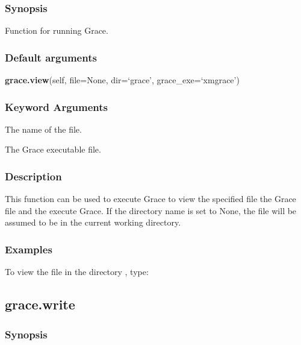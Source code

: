 \subsubsection{Synopsis}

Function for running Grace.

\subsubsection{Default arguments}

\textsf{\textbf{grace.view}(self, file=None, dir=`grace', grace\_exe=`xmgrace')}


\subsubsection{Keyword Arguments}

  The name of the file.

  The Grace executable file.

\subsubsection{Description}

This function can be used to execute Grace to view the specified file the Grace 
 file
and the execute Grace. If the directory name is set to None, the file will be assumed to be
in the current working directory.


\subsubsection{Examples}

To view the file 
 in the directory 
, type:





\newpage

\subsection{grace.write}


\subsubsection{Synopsis}

